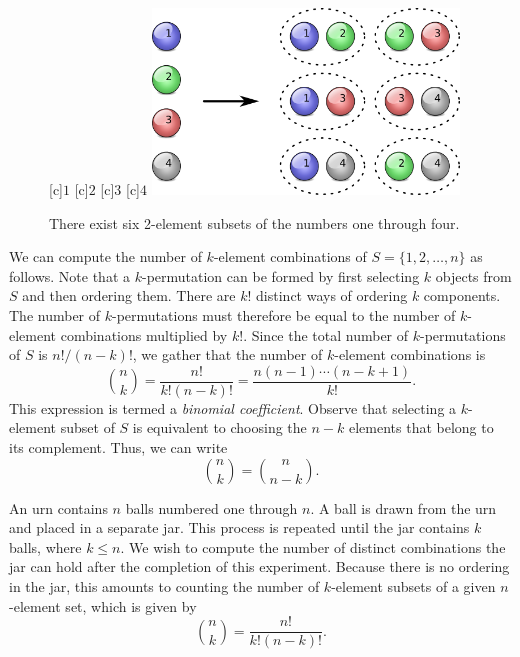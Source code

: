 \begin{figure}[htb!]
\begin{center}
\begin{psfrags}
[c]{$1$}
[c]{$2$}
[c]{$3$}
[c]{$4$}
\includegraphics[height=4.95cm]{Figures/4Chapter/combination}
\end{psfrags}
\caption{There exist six 2-element subsets of the numbers one through four.}
\label{figure:Combination}
\end{center}
\end{figure}

We can compute the number of $k$-element combinations of $S = \{ 1, 2, \ldots, n \}$ as follows.
Note that a $k$-permutation can be formed by first selecting $k$ objects from $S$ and then ordering them.
There are $k!$ distinct ways of ordering $k$ components.
The number of $k$-permutations must therefore be equal to the number of $k$-element combinations multiplied by $k!$.
Since the total number of $k$-permutations of $S$ is $n! / (n-k)!$, we gather that the number of $k$-element combinations is
\begin{equation*}
\binom{n}{k} = \frac{n!}{k! (n-k)!} = \frac{ n (n-1) \cdots (n-k+1) }{ k! } .
\end{equation*}
This expression is termed a \emph{binomial coefficient}. 
Observe that selecting a $k$-element subset of $S$ is equivalent to choosing the $n-k$ elements that belong to its complement.
Thus, we can write
\begin{equation*}
\binom{n}{k} = \binom{n}{n-k} .
\end{equation*}

\begin{example}
An urn contains $n$ balls numbered one through $n$.
A ball is drawn from the urn and placed in a separate jar.
This process is repeated until the jar contains $k$ balls, where $k \leq n$.
We wish to compute the number of distinct combinations the jar can hold after the completion of this experiment.
Because there is no ordering in the jar, this amounts to counting the number of $k$-element subsets of a given $n$-element set, which is given by
\begin{equation*}
\binom{n}{k} = \frac{n!}{k! (n-k)!}.
\end{equation*}
\end{example}

